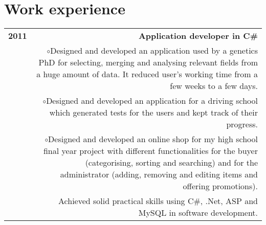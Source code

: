 \documentclass[11pt,a4paper]{article}
\begin{document}
\section*{Work experience\vspace{-2ex}}
\begin{tabular}{LR}
\bf 2011&\bf Application developer in C\#\vspace{5pt}\\
& \hspace{1em}$\circ$\hspace{1.5em}Designed and developed an application used by a genetics PhD for selecting, merging and analysing relevant fields from a huge amount of data. It reduced user's working time from a few weeks to a few days.\vspace{5pt}\\
& \hspace{1em}$\circ$\hspace{1.5em}Designed and developed an application for a driving school which generated tests for the users and kept track of their progress.\vspace{5pt}\\
& \hspace{1em}$\circ$\hspace{1.5em}Designed and developed an online shop for my high school final year project with different functionalities for the buyer (categorising, sorting and searching) and for the administrator (adding, removing and editing items and offering promotions).\vspace{5pt}\\
&Achieved solid practical skills using C\#, .Net, ASP and MySQL in software development.\vspace{5pt}\\

\end{tabular}

\end{document}
